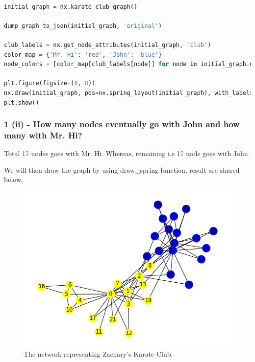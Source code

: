 \documentclass[12pt]{article}
\begin{document}
\\ 
\begin{lstlisting}[language=Python, caption=Assigning a color code to nodes based on their club affiliation.]
initial_graph = nx.karate_club_graph()

dump_graph_to_json(initial_graph, 'original')

club_labels = nx.get_node_attributes(initial_graph, 'club')
color_map = {'Mr. Hi': 'red', 'John': 'blue'}
node_colors = [color_map[club_labels[node]] for node in initial_graph.nodes()]

plt.figure(figsize=(8, 8))
nx.draw(initial_graph, pos=nx.spring_layout(initial_graph), with_labels=True, node_color=node_colors, node_size=400)
plt.show()

\end{lstlisting}

\subsubsection*{1 (ii) - How many nodes eventually go with John and how many with Mr. Hi?}

Total 17 nodes goes with Mr. Hi. Whereas, remaining i.e 17 node goes with John.

We will then draw the graph by using draw\_spring function, result are shared below,

\begin{figure}[h]
\caption{The network representing Zachary's Karate Club.}
\centering
\includegraphics[width=\textwidth]{Figure_1.png}
\end{figure}
\end{document}
